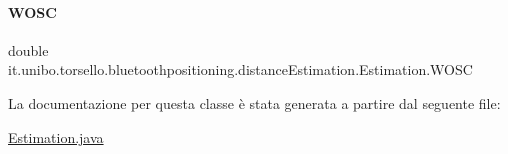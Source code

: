 \hypertarget{classit_1_1unibo_1_1torsello_1_1bluetoothpositioning_1_1distanceEstimation_1_1Estimation_a53237b14bc1d27ae4f751b02d798b595_a53237b14bc1d27ae4f751b02d798b595}{}\label{classit_1_1unibo_1_1torsello_1_1bluetoothpositioning_1_1distanceEstimation_1_1Estimation_a53237b14bc1d27ae4f751b02d798b595_a53237b14bc1d27ae4f751b02d798b595} 
\paragraph{\texorpdfstring{W\+O\+SC}{WOSC}}
{\footnotesize\ttfamily double it.\+unibo.\+torsello.\+bluetoothpositioning.\+distance\+Estimation.\+Estimation.\+W\+O\+SC\hspace{0.3cm}{\ttfamily [private]}}



La documentazione per questa classe è stata generata a partire dal seguente file\+:\begin{DoxyCompactItemize}
\item 
\hyperlink{Estimation_8java}{Estimation.\+java}\end{DoxyCompactItemize}
